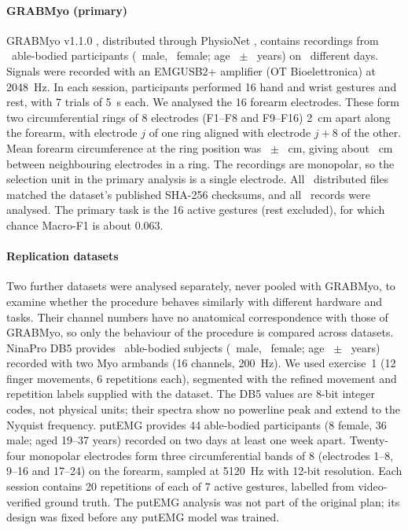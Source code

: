 \paragraph{GRABMyo (primary)}
GRABMyo v1.1.0 \citep{pradhan2022multiday,jiang2024grabmyo}, distributed through PhysioNet \citep{goldberger2000physionet}, contains recordings from \GRABMyoParticipants\ able-bodied participants (\GRABMyoMale\ male, \GRABMyoFemale\ female; age \GRABMyoAgeMean\ $\pm$ \GRABMyoAgeSD\ years) on \GRABMyoSessions\ different days. Signals were recorded with an EMGUSB2+ amplifier (OT Bioelettronica) at 2048~Hz. In each session, participants performed 16 hand and wrist gestures and rest, with 7 trials of 5~s each. We analysed the 16 forearm electrodes. These form two circumferential rings of 8 electrodes (F1--F8 and F9--F16) 2~cm apart along the forearm, with electrode $j$ of one ring aligned with electrode $j+8$ of the other. Mean forearm circumference at the ring position was \GRABMyoCircMean\ $\pm$ \GRABMyoCircSD~cm, giving about \GRABMyoArcSpacing~cm between neighbouring electrodes in a ring. The recordings are monopolar, so the selection unit in the primary analysis is a single electrode. All \GRABMyoFilesVerified\ distributed files matched the dataset's published SHA-256 checksums, and all \GRABMyoRecords\ records were analysed. The primary task is the 16 active gestures (rest excluded), for which chance Macro-F1 is about 0.063.

\paragraph{Replication datasets}
Two further datasets were analysed separately, never pooled with GRABMyo, to examine whether the procedure behaves similarly with different hardware and tasks. Their channel numbers have no anatomical correspondence with those of GRABMyo, so only the behaviour of the procedure is compared across datasets.
NinaPro DB5 \citep{pizzolato2017comparison} provides \DBFiveSubjects\ able-bodied subjects (\DBFiveMale\ male, \DBFiveFemale\ female; age \DBFiveAgeMean\ $\pm$ \DBFiveAgeSD\ years) recorded with two Myo armbands (16 channels, 200~Hz). We used exercise~1 (12 finger movements, 6 repetitions each), segmented with the refined movement and repetition labels supplied with the dataset. The DB5 values are 8-bit integer codes, not physical units; their spectra show no powerline peak and extend to the Nyquist frequency.
putEMG \citep{kaczmarek2019putemg} provides 44 able-bodied participants (8 female, 36 male; aged 19--37 years) recorded on two days at least one week apart. Twenty-four monopolar electrodes form three circumferential bands of 8 (electrodes 1--8, 9--16 and 17--24) on the forearm, sampled at 5120~Hz with 12-bit resolution. Each session contains 20 repetitions of each of 7 active gestures, labelled from video-verified ground truth. The putEMG analysis was not part of the original plan; its design was fixed before any putEMG model was trained.

